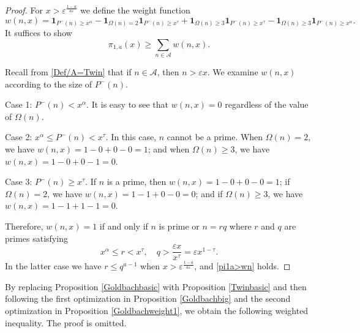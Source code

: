 \documentclass[12pt, a4paper]{amsart}
\def\le{\leqslant}
\def\ge{\geqslant}
\theoremstyle{plain}
\theoremstyle{remark}
\numberwithin{equation}{section}
\begin{document}
\begin{proof}
For \(x > \varepsilon^{\frac{1-a}{a\varepsilon}} \) we define the weight function  
\[
w(n,x)
=\mathbf{1}_{P^{-}(n)\ge x^\alpha}-\mathbf{1}_{\Omega(n)=2}\mathbf{1}_{P^{-}(n)\ge x^\tau}
+\mathbf{1}_{\Omega(n)\ge 3}\mathbf{1}_{P^{-}(n)\ge x^\tau}-\mathbf{1}_{\Omega(n)\ge 3}\mathbf{1}_{P^{-}(n)\ge x^\alpha}. 
\]
It suffices to show  
\begin{equation}\label{pi1a>wn}
\pi_{1,a}(x)\ge\sum\limits_{n\in \mathscr{A}}w(n,x).
\end{equation}

Recall from \eqref{Def/A=Twin} that if $n\in \mathscr{A}$, then $n>\varepsilon x$.  
We examine \( w(n, x) \) according to the size of \( P^{-}(n) \). 

Case 1: $P^{-}(n)<x^{\alpha}$. 
It is easy to see that $w(n,x)=0$ regardless of the value of $\Omega(n)$.
		
Case 2: $x^{\alpha}\le P^{-}(n)<x^{\tau}$.
In this case, $n$ cannot be a prime. When $\Omega(n)=2$, we have $w(n,x)=1-0+0-0=1$; and when $\Omega(n)\ge 3$, we have $w(n,x)=1-0+0-1=0$.
		
Case 3: $P^{-}(n)\ge x^{\tau}$.
If $n$ is a prime, then $w(n,x)=1-0+0-0=1$; if $\Omega(n)=2$, we have $w(n,x)=1-1+0-0=0$; 
and if $\Omega(n)\ge 3$, we have $w(n,x)=1-1+1-1=0$.
		
		
Therefore, $w(n,x)=1$ if and only if $n$ is prime or $n=rq$ where $r$ and $q$ are primes satisfying
$$
x^{\alpha}\le r<x^{\tau}, \quad q> \dfrac{\varepsilon x}{x^{\tau}}=\varepsilon x^{1-\tau}. 
$$
In the latter case we have
$r\le q^{a-1}$ when $x>\varepsilon^{\frac{1-a}{a\varepsilon}}$, and 
\eqref{pi1a>wn} holds.
\end{proof}

By replacing Proposition \ref{Goldbachbasic} with Proposition \ref{Twinbasic} and then following the first optimization in Proposition \ref{Goldbachbig} and the second optimization in Proposition \ref{Goldbachweight1}, we obtain the following weighted inequality. The proof is omitted.
\end{document}
